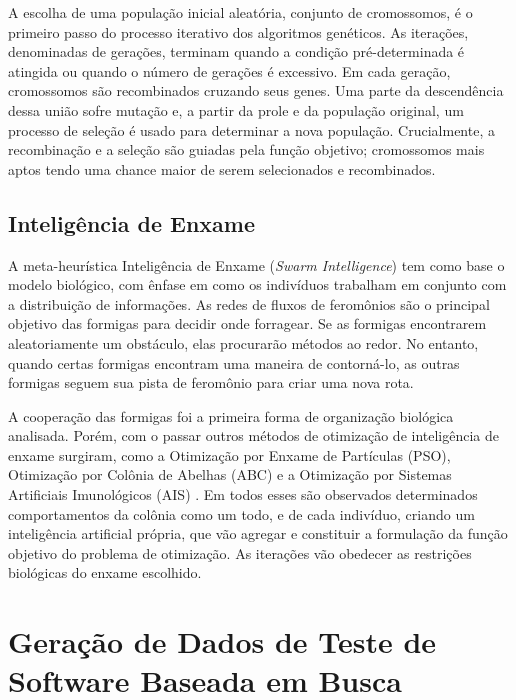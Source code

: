 A escolha de uma população inicial aleatória, conjunto de cromossomos, é o primeiro passo do processo iterativo dos algoritmos genéticos. As iterações, denominadas de gerações, terminam quando a condição pré-determinada é atingida ou quando o número de gerações é excessivo. Em cada geração, cromossomos são recombinados cruzando seus genes. Uma parte da descendência dessa união sofre mutação e, a partir da prole e da população original, um processo de seleção é usado para determinar a nova população. Crucialmente, a recombinação e a seleção são guiadas pela função objetivo; cromossomos mais aptos tendo uma chance maior de serem selecionados e recombinados.

\subsection{Inteligência de Enxame}

A meta-heurística Inteligência de Enxame (\textit{Swarm Intelligence}) tem como base o modelo biológico, com ênfase em como os indivíduos trabalham em conjunto com a distribuição de informações. As redes de fluxos de feromônios são o principal objetivo das formigas para decidir onde forragear. Se as formigas encontrarem aleatoriamente um obstáculo, elas procurarão métodos ao redor. No entanto, quando certas formigas encontram uma maneira de contorná-lo, as outras formigas seguem sua pista de feromônio para criar uma nova rota.

A cooperação das formigas foi a primeira forma de organização biológica analisada. Porém, com o passar outros métodos de otimização de inteligência de enxame surgiram, como a Otimização por Enxame de Partículas (PSO), Otimização por Colônia de Abelhas (ABC) e a Otimização por Sistemas Artificiais Imunológicos (AIS) \cite{blum2008swarm}. Em todos esses são observados determinados comportamentos da colônia como um todo, e de cada indivíduo, criando um inteligência artificial própria, que vão agregar e constituir a formulação da função objetivo do problema de otimização. As iterações vão obedecer as restrições biológicas do enxame escolhido.

\section{Geração de Dados de Teste de Software Baseada em Busca \label{sec:trabsSBST}}


